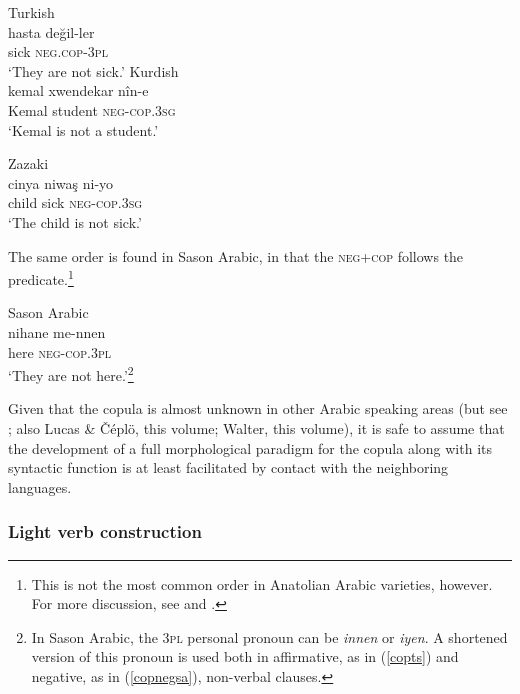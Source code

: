 \documentclass[output=paper]{langsci/langscibook}
\begin{document}
\begin{exe}
\ex \label{copneg} 
		\begin{xlist}
		\ex Turkish \\\label{copnegtk}\gll hasta 	değil-ler		\\
    sick	\textsc{neg.cop-3pl} \\
       \glt `They are not sick.'
	\ex Kurdish \\\label{copnegkr}  \gll kemal	xwendekar  	nîn-e	 \\
    Kemal	student		\textsc{neg-cop.3sg}\\
    \glt    `Kemal is not a student.'
    
        
		\ex Zazaki \\ \label{copnegza} \gll  cinya 	niwaş   ni-yo\\
        child	sick	\textsc{neg-cop.3sg} \\
        \glt `The child is not sick.'
        \end{xlist}
      
\end{exe}

\noindent  The same order is found in Sason Arabic, in that the \textsc{neg+cop} follows the predicate.\footnote{This is not the most common order in Anatolian Arabic varieties, however. For more discussion, see \cite{Jastrow2011anatolian} and \cite{Akkus2016,Akkus2017}.} 
\newpage
\begin{exe}
\ex\label{copnegsa} Sason Arabic\\ 
\gll nihane me-nnen	\\
here 	\textsc{neg-cop.3pl} \\
        \glt `They are not here.'\footnote{In Sason Arabic, the 3\textsc{pl} personal pronoun can be \textit{innen} or \textit{iyen}. A shortened version of this pronoun is used both in affirmative, as in (\ref{copts}) and negative, as in (\ref{copnegsa}), non-verbal clauses. }
\end{exe}
	
\noindent Given that the copula is almost unknown in other Arabic speaking areas (but see \citealt{Blanc1964}; also Lucas \& Čéplö, this volume; Walter, this volume), it is safe to assume that the development of a full morphological paradigm for the copula along with its syntactic function is at least facilitated by contact with the neighboring languages.


\subsubsection{Light verb construction}
\end{document}
